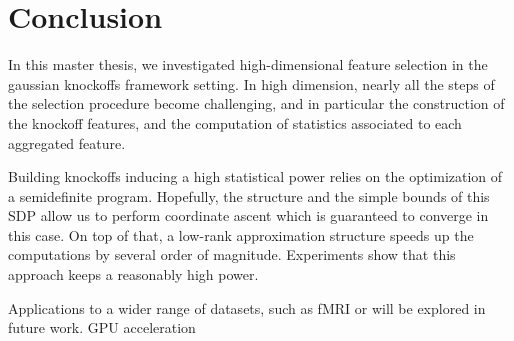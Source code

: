\cleardoublepage
\chapter*{Conclusion}

In this master thesis,
we investigated high-dimensional feature selection
in the gaussian knockoffs framework setting.
In high dimension, nearly all the steps of the selection procedure become challenging,
and in particular the construction of the knockoff features,
and the computation of statistics associated to each aggregated feature.

Building knockoffs inducing a high statistical power relies on the optimization of a semidefinite program.
Hopefully, the structure and the simple bounds of this SDP allow us to perform coordinate ascent which
is guaranteed to converge in this case.
On top of that, a low-rank approximation structure speeds up the computations by several order of magnitude.
Experiments show that this approach keeps a reasonably high power.

Applications to a wider range of datasets, such as fMRI or will be explored in future work.
GPU acceleration
